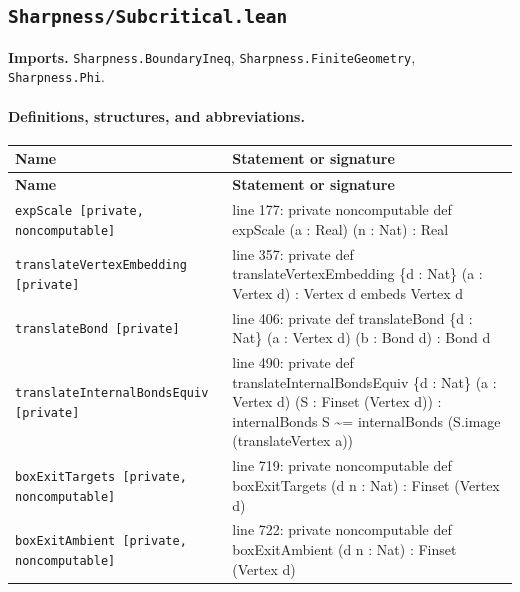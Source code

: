 \documentclass[10pt]{article}
\newcommand{\module}[1]{\texttt{#1}}
\begin{document}
\subsection*{\module{Sharpness/Subcritical.lean}}
\textbf{Imports.} \module{Sharpness.BoundaryIneq}, \module{Sharpness.FiniteGeometry}, \module{Sharpness.Phi}.
\paragraph{Definitions, structures, and abbreviations.}
\begin{longtable}{>{\raggedright\arraybackslash}p{} >{\raggedright\arraybackslash}p{}}
\textbf{Name} & \textbf{Statement or signature} \\
\hline
\endfirsthead
\textbf{Name} & \textbf{Statement or signature} \\
\hline
\endhead
\texttt{expScale [private,\allowbreak{} noncomputable]} & {\ttfamily\scriptsize line 177:\allowbreak{} private noncomputable def expScale (\allowbreak{}a :\allowbreak{} Real)\allowbreak{} (\allowbreak{}n :\allowbreak{} Nat)\allowbreak{} :\allowbreak{} Real} \\[0.45em]
\texttt{translateVertexEmbedding [private]} & {\ttfamily\scriptsize line 357:\allowbreak{} private def translateVertexEmbedding \{d :\allowbreak{} Nat\} (\allowbreak{}a :\allowbreak{} Vertex d)\allowbreak{} :\allowbreak{} Vertex d embeds Vertex d} \\[0.45em]
\texttt{translateBond [private]} & {\ttfamily\scriptsize line 406:\allowbreak{} private def translateBond \{d :\allowbreak{} Nat\} (\allowbreak{}a :\allowbreak{} Vertex d)\allowbreak{} (\allowbreak{}b :\allowbreak{} Bond d)\allowbreak{} :\allowbreak{} Bond d} \\[0.45em]
\texttt{translateInternalBondsEquiv [private]} & {\ttfamily\scriptsize line 490:\allowbreak{} private def translateInternalBondsEquiv \{d :\allowbreak{} Nat\} (\allowbreak{}a :\allowbreak{} Vertex d)\allowbreak{} (\allowbreak{}S :\allowbreak{} Finset (\allowbreak{}Vertex d)\allowbreak{})\allowbreak{} :\allowbreak{} internalBonds S \textasciitilde{}=\allowbreak{} internalBonds (\allowbreak{}S.\allowbreak{}image (\allowbreak{}translateVertex a)\allowbreak{})\allowbreak{}} \\[0.45em]
\texttt{boxExitTargets [private,\allowbreak{} noncomputable]} & {\ttfamily\scriptsize line 719:\allowbreak{} private noncomputable def boxExitTargets (\allowbreak{}d n :\allowbreak{} Nat)\allowbreak{} :\allowbreak{} Finset (\allowbreak{}Vertex d)\allowbreak{}} \\[0.45em]
\texttt{boxExitAmbient [private,\allowbreak{} noncomputable]} & {\ttfamily\scriptsize line 722:\allowbreak{} private noncomputable def boxExitAmbient (\allowbreak{}d n :\allowbreak{} Nat)\allowbreak{} :\allowbreak{} Finset (\allowbreak{}Vertex d)\allowbreak{}} \\[0.45em]
\end{longtable}
\end{document}
